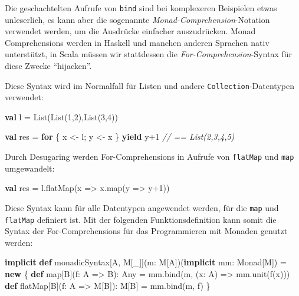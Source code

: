 \documentclass[]{article}
\newenvironment{Shaded}{}{}
\newcommand{\CommentTok}[1]{\textcolor[rgb]{0.38,0.63,0.69}{\textit{#1}}}
\newcommand{\DecValTok}[1]{\textcolor[rgb]{0.25,0.63,0.44}{#1}}
\newcommand{\FunctionTok}[1]{\textcolor[rgb]{0.02,0.16,0.49}{#1}}
\newcommand{\KeywordTok}[1]{\textcolor[rgb]{0.00,0.44,0.13}{\textbf{#1}}}
\newcommand{\NormalTok}[1]{#1}
\begin{document}
Die geschachtelten Aufrufe von \texttt{bind} sind bei komplexeren
Beispielen etwas unleserlich, es kann aber die sogenannte
\emph{Monad-Comprehension}-Notation verwendet werden, um die Ausdrücke
einfacher auszudrücken. Monad Comprehensions werden in Haskell und
manchen anderen Sprachen nativ unterstützt, in Scala müssen wir
stattdessen die \emph{For-Comprehension}-Syntax für diese Zwecke
``hijacken''.

Diese Syntax wird im Normalfall für Listen und andere
\texttt{Collection}-Datentypen verwendet:

\begin{Shaded}
\begin{Highlighting}[]
\KeywordTok{val}\NormalTok{ l = List(List(}\DecValTok{1}\NormalTok{,}\DecValTok{2}\NormalTok{),List(}\DecValTok{3}\NormalTok{,}\DecValTok{4}\NormalTok{))}

\KeywordTok{val}\NormalTok{ res = }\KeywordTok{for}\NormalTok{ \{}
\NormalTok{  x \textless{}{-} l; }
\NormalTok{  y \textless{}{-} x \} }\KeywordTok{yield}\NormalTok{ y+}\DecValTok{1} \CommentTok{// == List(2,3,4,5)}
\end{Highlighting}
\end{Shaded}

Durch Desugaring werden For-Comprehensions in Aufrufe von
\texttt{flatMap} und \texttt{map} umgewandelt:

\begin{Shaded}
\begin{Highlighting}[]
\KeywordTok{val}\NormalTok{ res = l.}\FunctionTok{flatMap}\NormalTok{(x =\textgreater{} x.}\FunctionTok{map}\NormalTok{(y =\textgreater{} y+}\DecValTok{1}\NormalTok{))}
\end{Highlighting}
\end{Shaded}

Diese Syntax kann für alle Datentypen angewendet werden, für die
\texttt{map} und \texttt{flatMap} definiert ist. Mit der folgenden
Funktionsdefinition kann somit die Syntax der For-Comprehensions für das
Programmieren mit Monaden genutzt werden:

\begin{Shaded}
\begin{Highlighting}[]
\KeywordTok{implicit} \KeywordTok{def}\NormalTok{ monadicSyntax[A, M[\_]](m: M[A])(}\KeywordTok{implicit}\NormalTok{ mm: Monad[M]) = }\KeywordTok{new}\NormalTok{ \{}
  \KeywordTok{def}\NormalTok{ map[B](f: A =\textgreater{} B): Any = mm.}\FunctionTok{bind}\NormalTok{(m, (x: A) =\textgreater{} mm.}\FunctionTok{unit}\NormalTok{(}\FunctionTok{f}\NormalTok{(x)))}
  \KeywordTok{def}\NormalTok{ flatMap[B](f: A =\textgreater{} M[B]): M[B] = mm.}\FunctionTok{bind}\NormalTok{(m, f)}
\NormalTok{\}}
\end{Highlighting}
\end{Shaded}
\end{document}
